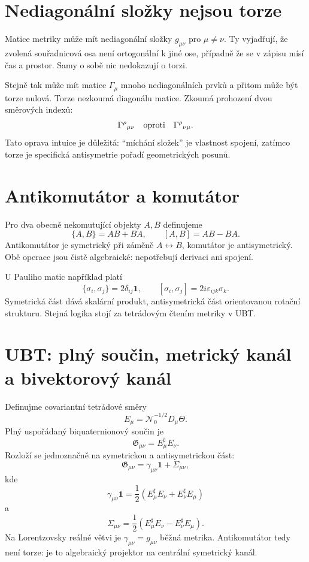 \section{Nediagonální složky nejsou torze}
Matice metriky může mít nediagonální složky $g_{\mu\nu}$ pro $\mu\neq\nu$.
Ty vyjadřují, že zvolená souřadnicová osa není ortogonální k jiné ose, případně
že se v zápisu mísí čas a prostor. Samy o sobě nic nedokazují o torzi.

Stejně tak může mít matice $\Gamma_\mu$ mnoho nediagonálních prvků a přitom
může být torze nulová. Torze nezkoumá diagonálu matice. Zkoumá prohození dvou
směrových indexů:
\[
  \Gamma^\rho{}_{\mu\nu}
  \quad\hbox{oproti}\quad
  \Gamma^\rho{}_{\nu\mu}.
\]
Tato oprava intuice je důležitá: ``míchání složek'' je vlastnost spojení,
zatímco torze je specifická antisymetrie pořadí geometrických posunů.

\section{Antikomutátor a komutátor}

Pro dva obecně nekomutující objekty $A,B$ definujeme
\[
  \{A,B\}=AB+BA,
  \qquad
  [A,B]=AB-BA.
\]
Antikomutátor je symetrický při záměně $A\leftrightarrow B$, komutátor je
antisymetrický. Obě operace jsou čistě algebraické: nepotřebují derivaci ani
spojení.

U Pauliho matic například platí
\[
  \{\sigma_i,\sigma_j\}=2\delta_{ij}\mathbf 1,
  \qquad
  [\sigma_i,\sigma_j]=2i\varepsilon_{ijk}\sigma_k.
\]
Symetrická část dává skalární produkt, antisymetrická část orientovanou rotační
strukturu. Stejná logika stojí za tetrádovým čtením metriky v UBT.

\section{UBT: plný součin, metrický kanál a bivektorový kanál}

Definujme covariantní tetrádové směry
\[
  E_\mu=\mathcal N_0^{-1/2}D_\mu\Theta.
\]
Plný uspořádaný biquaternionový součin je
\[
  \mathfrak G_{\mu\nu}=E_\mu^\sharp E_\nu.
\]
Rozloží se jednoznačně na symetrickou a antisymetrickou část:
\[
  \mathfrak G_{\mu\nu}
  =\gamma_{\mu\nu}\mathbf 1+\Sigma_{\mu\nu},
\]
kde
\[
  \boxed{
  \gamma_{\mu\nu}\mathbf 1
  =\frac12\left(E_\mu^\sharp E_\nu+E_\nu^\sharp E_\mu\right)}
\]
a
\[
  \boxed{
  \Sigma_{\mu\nu}
  =\frac12\left(E_\mu^\sharp E_\nu-E_\nu^\sharp E_\mu\right).}
\]
Na Lorentzovsky reálné větvi je $\gamma_{\mu\nu}=g_{\mu\nu}$ běžná metrika.
Antikomutátor tedy není torze: je to algebraický projektor na centrální
symetrický kanál.

